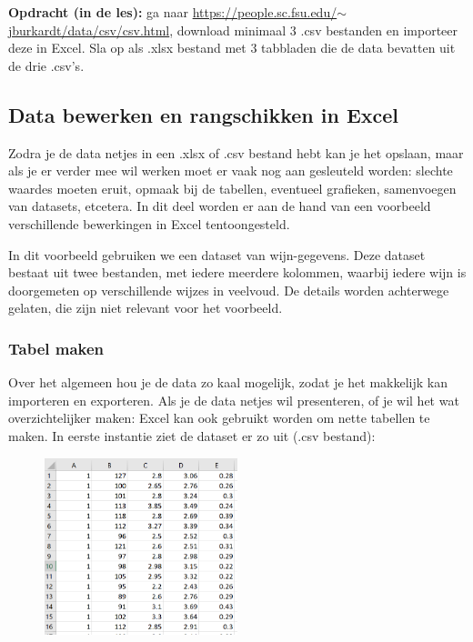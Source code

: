\textbf{Opdracht (in de les):} ga naar \href{https://people.sc.fsu.edu/~jburkardt/data/csv/csv.html}{\textsf{https://people.sc.fsu.edu/$\sim$jburkardt/data/csv/csv.html}}, download minimaal 3 .csv bestanden en importeer deze in Excel. Sla op als .xlsx bestand met 3 tabbladen die de data bevatten uit de drie .csv's.

\subsection{Data bewerken en rangschikken in Excel}
Zodra je de data netjes in een .xlsx of .csv bestand hebt kan je het opslaan, maar als je er verder mee wil werken moet er vaak nog aan gesleuteld worden: slechte waardes moeten eruit, opmaak bij de tabellen, eventueel grafieken, samenvoegen van datasets, etcetera. In dit deel worden er aan de hand van een voorbeeld verschillende bewerkingen in Excel tentoongesteld.

In dit voorbeeld gebruiken we een dataset van wijn-gegevens. Deze dataset bestaat uit twee bestanden, met iedere meerdere kolommen, waarbij iedere wijn is doorgemeten op verschillende wijzes in veelvoud. De details worden achterwege gelaten, die zijn niet relevant voor het voorbeeld. 

\subsubsection*{Tabel maken}
Over het algemeen hou je de data zo kaal mogelijk, zodat je het makkelijk kan importeren en exporteren. Als je de data netjes wil presenteren, of je wil het wat overzichtelijker maken: Excel kan ook gebruikt worden om nette tabellen te maken.
In eerste instantie ziet de dataset er zo uit (.csv bestand):

\begin{figure}[h]
\begin{center}
\includegraphics[width=0.5\textwidth]{img/wijn1.png}
\end{center}
\end{figure}

